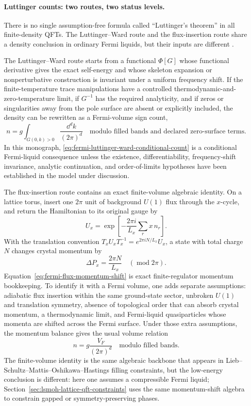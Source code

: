 \paragraph{Luttinger counts: two routes, two status levels.}
There is no single assumption-free formula called ``Luttinger's theorem'' in
all finite-density QFTs.  The Luttinger--Ward route and the flux-insertion
route share a density conclusion in ordinary Fermi liquids, but their inputs
are different \cite{LuttingerWard1960,Luttinger1960,Oshikawa2000Luttinger}.

The Luttinger--Ward route starts from a functional \(\Phi[G]\) whose functional
derivative gives the exact self-energy and whose skeleton expansion or
nonperturbative construction is invariant under a uniform frequency shift.  If
the finite-temperature trace manipulations have a controlled
thermodynamic-and-zero-temperature limit, if \(G^{-1}\) has the required
analyticity, and if zeros or singularities away from the pole surface are
absent or explicitly included, the density can be rewritten as a Fermi-volume
sign count,
\begin{equation}
  n
  =
  g\int_{G(0,k)>0}\frac{\dd^dk}{(2\pi)^d}
  \quad
  \text{modulo filled bands and declared zero-surface terms}.
  \label{eq:fermi-luttinger-ward-conditional-count}
\end{equation}
In this monograph, \eqref{eq:fermi-luttinger-ward-conditional-count} is a
conditional Fermi-liquid consequence unless the existence, differentiability,
frequency-shift invariance, analytic continuation, and order-of-limits
hypotheses have been established in the model under discussion.

The flux-insertion route contains an exact finite-volume algebraic identity.
On a lattice torus, insert one \(2\pi\) unit of background \(U(1)\) flux through
the \(x\)-cycle, and return the Hamiltonian to its original gauge by
\[
  U_x
  =
  \exp\!\left[
    -\frac{2\pi i}{L_x}\sum_r x\,n_r
  \right].
\]
With the translation convention
\(T_xU_xT_x^{-1}=e^{2\pi iN/L_x}U_x\), a state with total charge \(N\) changes
crystal momentum by
\begin{equation}
  \Delta P_x=\frac{2\pi N}{L_x}\quad (\operatorname{mod} 2\pi).
  \label{eq:fermi-flux-momentum-shift}
\end{equation}
Equation~\eqref{eq:fermi-flux-momentum-shift} is exact finite-regulator
momentum bookkeeping.  To identify it with a Fermi volume, one adds separate
assumptions: adiabatic flux insertion within the same ground-state sector,
unbroken \(U(1)\) and translation symmetry, absence of topological order that
can absorb crystal momentum, a thermodynamic limit, and Fermi-liquid
quasiparticles whose momenta are shifted across the Fermi surface.  Under those
extra assumptions, the momentum balance gives the usual volume relation
\[
  n
  =
  g\frac{V_F}{(2\pi)^d}
  \quad \text{modulo filled bands}.
\]
The finite-volume identity is the same algebraic backbone that appears in
Lieb--Schultz--Mattis--Oshikawa--Hastings filling constraints, but the
low-energy conclusion is different: here one assumes a compressible Fermi
liquid; Section~\ref{sec:lsmoh-lattice-qft-constraints} uses the same
momentum-shift algebra to constrain gapped or symmetry-preserving phases.

